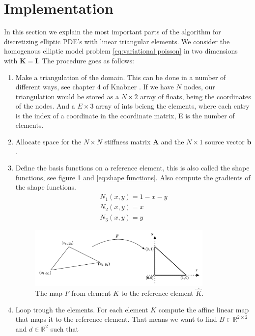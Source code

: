 \documentclass[../Main/main.tex]{subfiles}
\begin{document}
	\section*{Implementation}
	In this section we explain the most important parts of the algorithm for discretizing elliptic PDE's with linear triangular elements. We consider the homogenous elliptic model problem \eqref{eq:variational poisson} in two dimensions with $\pmb{K} = \pmb{I}$. The procedure goes as follows:
	\begin{enumerate}
		\item Make a triangulation of the domain. This can be done in a number of different ways, see chapter 4 of Knabner \cite{Knabner}. If we have $N$ nodes, our triangulation would be stored as a $N \times 2$ array of floats, being the coordinates of the nodes. And a $E\times 3$ array of ints beieng the elements, where each entry is the index of a coordinate in the coordinate matrix, E is the number of elements.
		\item Allocate space for the $N \times N$ stiffness matrix $\pmb{A}$ and the $N \times 1$ source vector $\pmb{b}$.
		\item Define the basis functions on a reference element, this is also called the shape functions, see figure \ref{fig:reference element} and \eqref{eq:shape functions}. Also compute the gradients of the shape functions. 
		\begin{equation}
			\begin{gathered}\label{eq:shape functions}
				N_1(x,y) = 1-x-y\\
				N_2(x,y) = x\\
				N_3(x,y) = y
			\end{gathered}
		\end{equation}
		\begin{figure}[H]
			\centering
			\includegraphics[width=0.85\textwidth]{reference element.pdf}
			\caption{The map $F$ from element $K$ to the reference element $\hat{K}$.}
			\label{fig:reference element}
		\end{figure}
		\item Loop trough the elements. For each element $K$ compute the affine linear map that maps it to the reference element. That means we want to find $B\in \mathbb{R}^{2\times 2}$ and $d\in \mathbb{R}^2$ such that 

\end{enumerate}
\end{document}
